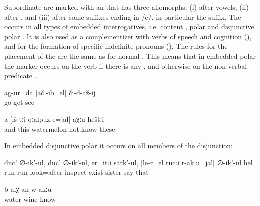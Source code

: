 Subordinate  are marked with an  that has three allomorphs: (i)  after vowels, (ii)  after , and (iii)  after some suffixes ending in /e/, in particular the  suffix. The  occurs in all types of embedded interrogatives, i.e. content , polar and disjunctive polar . It is also used as a complementizer with verbs of speech and cognition (), and for the formation of specific indefinite pronouns (). The rules for the placement of the  are the same as for normal . This means that in embedded polar  the marker occurs on the verb if there is any , and otherwise on the non-verbal predicate .

\begin{exe}

	\ex	\label{ex:We went to see if (the cartridge) had struck}
	\gll	ag-ur=da	[ačː-ib=el]	či-d-až-ij\\
		go	get	see\\
	\glt	{}

	\ex	\label{ex:I don't know whether these are watermelons}
	\gll	a	[iš-tːi	qːalpuz-e=jal]	aχːu	heštːi\\
		and	this	watermelon	not.know	these\\
	\glt	{}

\end{exe}

In embedded disjunctive polar  it occurs on all members of the disjunction:

\begin{exe}
	\ex	\label{ex:He ran and ran, looked around, wondering whether his sister is there or not}
	\gll	duc'	∅-ik'-ul,	duc'	∅-ik'-ul,	er=itːi	sark'-ul,		[le-r=el	rucːi	r-akːu=jal]	∅-ik'-ul	hel\\
		run		run		look=after	inspect	exist	sister		say	that\\
	\glt	{}

	\ex	\label{ex:Is this water or wine, I do not know}
	\gll	[hin	ca-d=el	iχ-tːi	čaˁʁir=el]	b-alχ-an	w-akːu\\
		water			wine	know	-\\
	\glt	{}
\end{exe}

